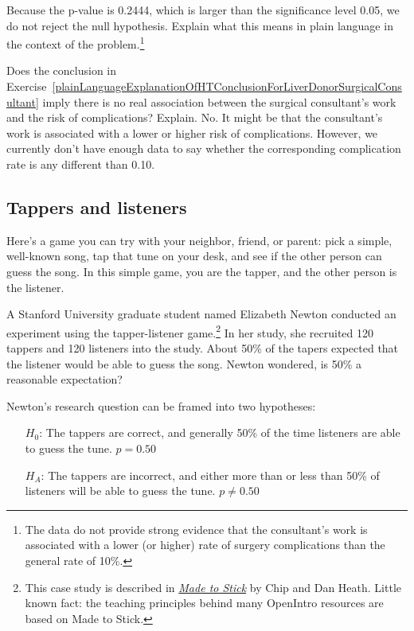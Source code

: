 \begin{exercise} \label{plainLanguageExplanationOfHTConclusionForLiverDonorSurgicalConsultant}
Because the p-value is 0.2444, which is larger than the significance level 0.05, we do not reject the null hypothesis. Explain what this means in plain language in the context of the problem.\footnote{The data do not provide strong evidence that the consultant's work is associated with a lower (or higher) rate of surgery complications than the general rate of 10\%.}
\end{exercise}

\begin{example}{Does the conclusion in Exercise~\ref{plainLanguageExplanationOfHTConclusionForLiverDonorSurgicalConsultant} imply there is no real association between the surgical consultant's work and the risk of complications? Explain.}
No. It might be that the consultant's work is associated with a lower or higher risk of complications. However, we currently don't have enough data to say whether the corresponding complication rate is any different than 0.10.
\end{example}


\subsection{Tappers and listeners}

Here's a game you can try with your neighbor, friend, or parent: pick a simple, well-known song, tap that tune on your desk, and see if the other person can guess the song. In this simple game, you are the tapper, and the other person is the listener.

A Stanford University graduate student named Elizabeth Newton conducted an experiment using the tapper-listener game.\footnote{This case study is described in \emph{\href{http://www.openintro.org/redirect.php?go=made-to-stick&redirect=textbook_pdf_preliminary}{Made to Stick}} by Chip and Dan Heath. Little known fact: the teaching principles behind many OpenIntro resources are based on Made to Stick.} In her study, she recruited 120 tappers and 120 listeners into the study. About 50\% of the tapers expected that the listener would be able to guess the song. Newton wondered, is 50\% a reasonable expectation?

Newton's research question can be framed into two hypotheses:
\begin{itemize}
\setlength{\itemsep}{0mm}
\item[$H_0$:] The tappers are correct, and generally 50\% of the time listeners are able to guess the tune. $p = 0.50$
\item[$H_A$:] The tappers are incorrect, and either more than or less than 50\% of listeners will be able to guess the tune. $p \neq 0.50$
\end{itemize}

